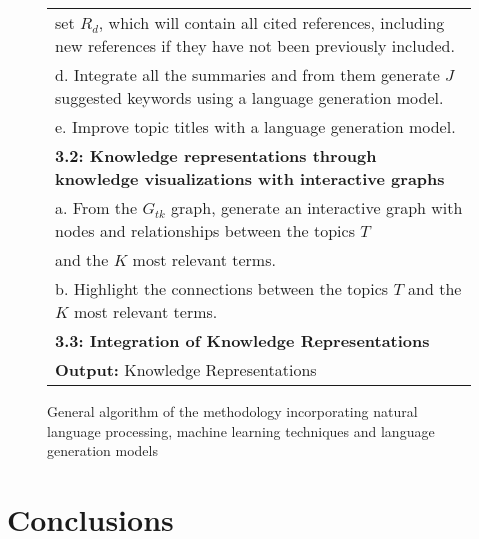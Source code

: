 \documentclass[runningheads]{llncs}
\begin{document}
\begin{figure*}[!h]
{\begin{tabular}{l}
			\quad \quad \quad set $R_d$, which will contain all cited references, including new references if they have not been previously included.\\
			\quad \quad d. Integrate all the summaries and from them generate $J$ suggested keywords using a language generation model.\\
			\quad \quad e. Improve topic titles with a language generation model.\\
			\quad \textbf{3.2: Knowledge representations through knowledge visualizations with interactive graphs}\\
			\quad \quad a. From the $G_{tk}$ graph, generate an interactive graph with nodes and relationships between the topics $T$\\
			\quad \quad and the $K$ most relevant terms.\\
			\quad \quad b. Highlight the connections between the topics $T$ and the $K$ most relevant terms.\\
			\quad \textbf{3.3: Integration of Knowledge Representations}\\
			\hline
			\textbf{Output:} Knowledge Representations \\
			\hline
		\end{tabular}
	}
	\caption{\centering General algorithm of the methodology incorporating natural language processing, machine learning techniques and language generation models}
	\label{tab:Algorithm}
\end{figure*}

\FloatBarrier


\section{Conclusions}
\end{document}
